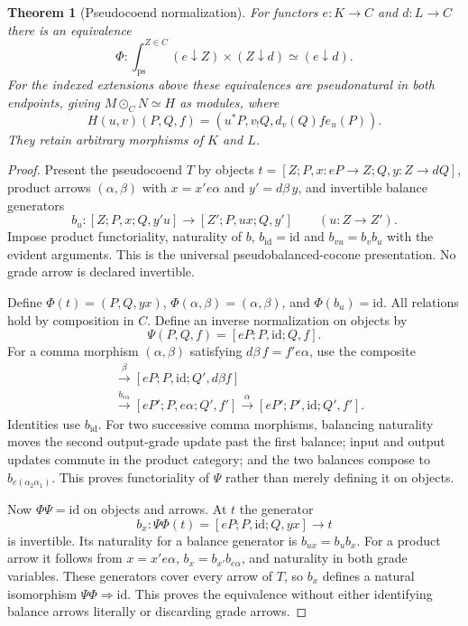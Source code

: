 \documentclass[11pt]{article}
\newtheorem{theorem}{Theorem}[section]
\theoremstyle{definition}
\newcommand{\id}{\mathrm{id}}
\newcommand{\coend}[1]{\int_{\mathrm{ps}}^{#1}}
\begin{document}
\begin{theorem}[Pseudocoend normalization]\label{thm:coend}
For functors $e:K\to C$ and $d:L\to C$ there is an equivalence
\[
 \Phi:\coend{Z\in C}(e\downarrow Z)\times(Z\downarrow d)
       \simeq(e\downarrow d).
\]
For the indexed extensions above these equivalences are pseudonatural in
both endpoints, giving $M\odot_C N\simeq H$ as modules, where
\[
 H(u,v)(P,Q,f)=(u^*P,v_!Q,d_v(Q)f e_u(P)).
\]
They retain arbitrary morphisms of $K$ and $L$.
\end{theorem}
\begin{proof}
Present the pseudocoend $T$ by objects
$t=[Z;P,x:eP\to Z;Q,y:Z\to dQ]$, product arrows $(\alpha,\beta)$ with
$x=x'e\alpha$ and $y'=d\beta\,y$, and invertible balance generators
\[
 b_u:[Z;P,x;Q,y'u]\longrightarrow[Z';P,ux;Q,y']
 \qquad(u:Z\to Z').
\]
Impose product functoriality, naturality of $b$, $b_{\id}=\id$ and
$b_{vu}=b_vb_u$ with the evident arguments. This is the universal
pseudobalanced-cocone presentation. No grade arrow is declared invertible.

Define $\Phi(t)=(P,Q,yx)$, $\Phi(\alpha,\beta)=(\alpha,\beta)$, and
$\Phi(b_u)=\id$. All relations hold by composition in $C$. Define an inverse
normalization on objects by
\[
 \Psi(P,Q,f)=[eP;P,\id;Q,f].
\]
For a comma morphism $(\alpha,\beta)$ satisfying
$d\beta\,f=f'e\alpha$, use the composite
\begin{align*}
 [eP;P,\id;Q,f]&\xrightarrow{\beta}
 [eP;P,\id;Q',d\beta f]\\
 &\xrightarrow{b_{e\alpha}}
 [eP';P,e\alpha;Q',f']
 \xrightarrow{\alpha}[eP';P',\id;Q',f'].
\end{align*}
Identities use $b_{\id}$. For two successive comma morphisms, balancing
naturality moves the second output-grade update past the first balance;
input and output updates commute in the product category; and the two
balances compose to $b_{e(\alpha_2\alpha_1)}$. This proves functoriality of
$\Psi$ rather than merely defining it on objects.

Now $\Phi\Psi=\id$ on objects and arrows. At $t$ the generator
\[
 b_x:\Psi\Phi(t)=[eP;P,\id;Q,yx]\longrightarrow t
\]
is invertible. Its naturality for a balance generator is
$b_{ux}=b_ub_x$. For a product arrow it follows from
$x=x'e\alpha$, $b_x=b_{x'}b_{e\alpha}$, and naturality in both grade
variables. These generators cover every arrow of $T$, so $b_x$ defines a
natural isomorphism $\Psi\Phi\Rightarrow\id$. This proves the equivalence
without either identifying balance arrows literally or discarding grade
arrows.


\end{proof}
\end{document}
